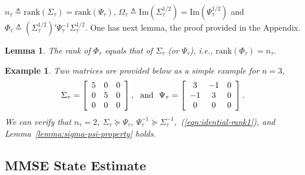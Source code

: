 \documentclass[twocolumn]{autart}    \usepackage{cite}
\newtheorem{lemma}[theorem]{Lemma}
\newtheorem{example}[theorem]{Example}
\begin{document}
{{$n_\tau\triangleq \mathrm{rank}(\Sigma_\tau)=\mathrm{rank}
(\Psi_\tau)$, $\Omega_\tau\triangleq \mathrm{Im}
(\Sigma_\tau^{1/2})=\mathrm{Im}
(\Psi_\tau^{1/2})$ and
$\Phi_\tau\triangleq
\left(\Sigma_\tau^{1/2}\right)'
\Psi_\tau^{-1}\Sigma_\tau^{1/2}.$
One has next lemma, the proof provided in the Appendix.
\begin{lemma}\label{lemma:rank-Phi}
The rank of $\Phi_\tau$ equals that of $\Sigma_\tau$ (or $\Psi_\tau$), i.e.,
$
\mathrm{rank}(\Phi_\tau
)=n_\tau.
$
\end{lemma}
\begin{example}
Two matrices are provided below
as a simple example for $n=3$,
$$
\Sigma_\tau=\left[\begin{array}{ccc}
5 & 0 &0\\
0&5&0\\
0&0&0\end{array}\right], \hbox{~~and~~}
\Psi_\tau=\left[\begin{array}{ccc}
3 & -1 &0\\
-1&3&0\\
0&0&0\end{array}\right].
$$
We can verify that $n_\tau=2$, $\Sigma_\tau\succeq \Psi_\tau$,
$\Psi_\tau^{-1}\succeq \Sigma_\tau^{-1}$,~(\ref{eqn:idential-rank1}), and Lemma~\ref{lemma:sigma-psi-property} holds.
\end{example}












\subsection{MMSE State Estimate}\label{subsec:bayesian-reference-power-schedule}

}}
\end{document}
